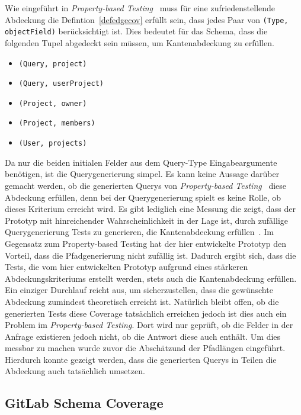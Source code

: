 Wie eingeführt in \textit{Property-based Testing}~\cite{property-based-testing} muss für eine zufriedenstellende Abdeckung
die Defintion~\ref{defedgecov} erfüllt sein, dass jedes Paar von \verb+(Type, objectField)+ berücksichtigt ist.
Dies bedeutet für das Schema, dass die folgenden Tupel abgedeckt sein müssen, um Kantenabdeckung zu erfüllen.
    \begin{itemize}
        \item \verb+(Query, project)+
        \item \verb+(Query, userProject)+
        \item \verb+(Project, owner)+
        \item \verb+(Project, members)+
        \item \verb+(User, projects)+
    \end{itemize}

Da nur die beiden initialen Felder aus dem Query-Type Eingabeargumente benötigen, ist die Querygenerierung simpel.
Es kann keine Aussage darüber gemacht werden, ob die generierten Querys von \textit{Property-based Testing}~\cite{property-based-testing} diese Abdeckung erfüllen, denn bei der Querygenerierung spielt es keine Rolle, ob dieses Kriterium erreicht wird.
Es gibt lediglich eine Messung die zeigt, dass der Prototyp mit hinreichender Wahrscheinlichkeit in der Lage ist, durch zufällige Querygenerierung Tests zu generieren, die Kantenabdeckung erfüllen~\cite[vgl. D.Results RQ1 ]{property-based-testing}.
Im Gegensatz zum Property-based Testing hat der hier entwickelte Prototyp den Vorteil, dass die Pfadgenerierung nicht zufällig ist.
Dadurch ergibt sich, dass die Tests, die vom hier entwickelten Prototyp aufgrund eines stärkeren Abdeckungskriteriums erstellt werden, stets auch die Kantenabdeckung erfüllen.
Ein einziger Durchlauf reicht aus, um sicherzustellen, dass die gewünschte Abdeckung zumindest theoretisch erreicht ist.
Natürlich bleibt offen, ob die generierten Tests diese Coverage tatsächlich erreichen jedoch ist dies auch ein Problem im \textit{Property-based Testing}.
Dort wird nur geprüft, ob die Felder in der Anfrage existieren jedoch nicht, ob die Antwort diese auch enthält.
Um dies messbar zu machen wurde zuvor die Abschätzund der Pfadlängen eingeführt.
Hierdurch konnte gezeigt werden, dass die generierten Querys in Teilen die Abdeckung auch tatsächlich umsetzen.

\subsection{GitLab Schema Coverage}

